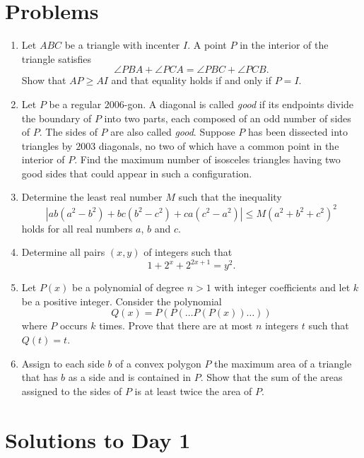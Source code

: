 \documentclass[11pt]{scrartcl}
\begin{document}
\section{Problems}
\begin{enumerate}[\bfseries 1.]
\item %
Let $ABC$ be a triangle with incenter $I$.
A point $P$ in the interior of the triangle satisfies
\[ \angle PBA + \angle PCA = \angle PBC + \angle PCB. \]
Show that $AP \ge AI$ and that equality holds if and only if $P=I$.

\item %
Let $P$ be a regular $2006$-gon.
A diagonal is called \emph{good} if its endpoints
divide the boundary of $P$ into two parts,
each composed of an odd number of sides of $P$.
The sides of $P$ are also called \emph{good}.
Suppose $P$ has been dissected into triangles by $2003$ diagonals,
no two of which have a common point in the interior of $P$.
Find the maximum number of isosceles triangles having two good
sides that could appear in such a configuration.

\item %
Determine the least real number $M$ such that the inequality
\[ \left\lvert ab(a^2-b^2)+bc(b^2-c^2)+ca(c^2-a^2) \right\rvert
  \leq M\left( a^2+b^2+c^2 \right)^2 \]
holds for all real numbers $a$, $b$ and $c$.

\item %
Determine all pairs $(x,y)$ of integers such that
\[ 1 + 2^x + 2^{2x+1} = y^2. \]

\item %
Let $P(x)$ be a polynomial of degree $n > 1$
with integer coefficients and let $k$ be a positive integer.
Consider the polynomial
\[ Q(x) = P(P(\dots P(P(x)) \dots )) \] where $P$ occurs $k$ times.
Prove that there are at most $n$ integers $t$ such that $Q(t) = t$.

\item %
Assign to each side $b$ of a convex polygon $P$
the maximum area of a triangle that has $b$
as a side and is contained in $P$.
Show that the sum of the areas assigned
to the sides of $P$ is at least twice the area of $P$.

\end{enumerate}
\pagebreak

\section{Solutions to Day 1}
\end{document}
